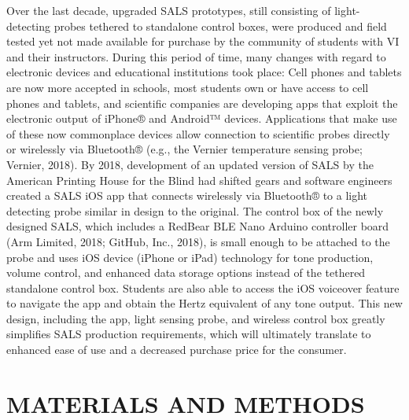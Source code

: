 \documentclass[11.5pt]{sig-alternate} %
\begin{document}
\begin{large}
Over the last decade, upgraded SALS prototypes, still consisting of light-detecting probes tethered to standalone control boxes, were produced and field tested yet not made available for purchase by the community of students with VI and their instructors. During this period of time, many changes with regard to electronic devices and educational institutions took place: Cell phones and tablets are now more accepted in schools, most students own or have access to cell phones and tablets, and scientific companies are developing apps that exploit the electronic output of iPhone® and Android™ devices. Applications that make use of these now commonplace devices allow connection to scientific probes directly or wirelessly via Bluetooth® (e.g., the Vernier temperature sensing probe; Vernier, 2018). By 2018, development of an updated version of SALS by the American Printing House for the Blind had shifted gears and software engineers created a SALS iOS app that connects wirelessly via Bluetooth® to a light detecting probe similar in design to the original. The control box of the newly designed SALS, which includes a RedBear BLE Nano Arduino controller board (Arm Limited, 2018; GitHub, Inc., 2018), is small enough to be attached to the probe and uses iOS device (iPhone or iPad) technology for tone production, volume control, and enhanced data storage options instead of the tethered standalone control box. Students are also able to access the iOS voiceover feature to navigate the app and obtain the Hertz equivalent of any tone output. This new design, including the app, light sensing probe, and wireless control box greatly simplifies SALS production requirements, which will ultimately translate to enhanced ease of use and a decreased purchase price for the consumer. 

\section*{MATERIALS AND METHODS}


\end{large}
\end{document}
